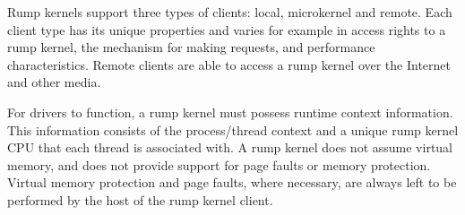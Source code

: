 Rump kernels support three types of clients: local, microkernel
and remote.  Each client type has its unique properties and varies for
example in access rights to a rump kernel, the mechanism for making
requests, and performance characteristics.  Remote clients are able to
access a rump kernel over the Internet and other media.

For drivers to function, a rump kernel must possess runtime context
information.  This information consists of the process/thread
context and a unique rump kernel CPU that each thread is associated
with.  A rump kernel does not assume virtual memory, and does not
provide support for page faults or memory protection.  Virtual
memory protection and page faults, where necessary, are always
left to be performed by the host of the rump kernel client.
